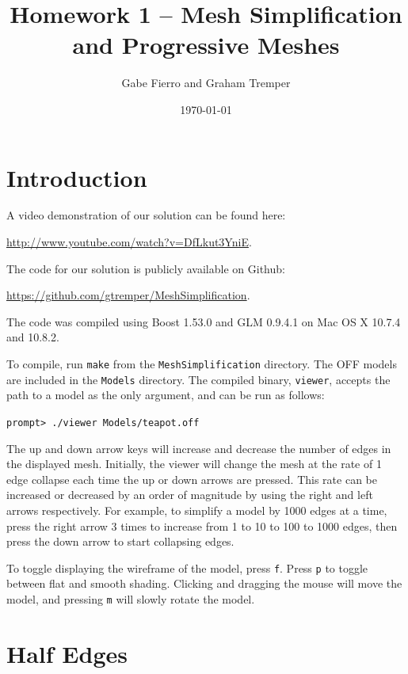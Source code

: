 \documentclass[11pt]{article}
\begin{document}
\title{Homework 1 -- Mesh Simplification and Progressive Meshes}
\author{Gabe Fierro and Graham Tremper}
\date{\today}
\maketitle

\section{Introduction}

A video demonstration of our solution can be found here:
\begin{center}
\href{http://www.youtube.com/watch?v=DfLkut3YniE}{http://www.youtube.com/watch?v=DfLkut3YniE}.
\end{center}
The code for our solution is publicly available on Github:
\begin{center}
\href{https://github.com/gtremper/MeshSimplification}{https://github.com/gtremper/MeshSimplification}.
\end{center}
The code was compiled using Boost 1.53.0 and GLM 0.9.4.1 on Mac OS X 10.7.4 and
10.8.2.

To compile, run \verb`make` from the \verb`MeshSimplification` directory. The OFF models
are included in the \verb`Models` directory. The compiled binary, \verb`viewer`,
accepts the path to a model as the only argument, and can be run as follows:

\begin{center}
  \verb`prompt> ./viewer Models/teapot.off`
\end{center}

The up and down arrow keys will increase and decrease the number of edges in
the displayed mesh. Initially, the viewer will change the mesh at the rate of 1
edge collapse each time the up or down arrows are pressed. This rate can be
increased or decreased by an order of magnitude by using the right and left
arrows respectively. For example, to simplify a model by 1000 edges at a time,
press the right arrow 3 times to increase from 1 to 10 to 100 to 1000 edges,
then press the down arrow to start collapsing edges.

To toggle displaying the wireframe of the model, press \verb`f`. Press \verb`p`
to toggle between flat and smooth shading. Clicking and dragging the mouse will
move the model, and pressing \verb`m` will slowly rotate the model.

\section{Half Edges}
\end{document}
